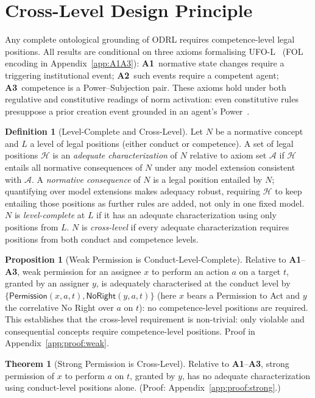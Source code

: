 \documentclass{IOS-Book-Article}
\newcommand{\PermPos}{\mathsf{Permission}}   %
\newcommand{\NoRight}{\mathsf{NoRight}}      %
\theoremstyle{definition}
\newtheorem{definition}{Definition}[section]
\newtheorem{theorem}{Theorem}[section]
\newtheorem{proposition}{Proposition}[section]
\begin{document}
\section{Cross-Level Design Principle}
\label{sec:crosslevel}
Any complete ontological grounding of ODRL requires
competence-level legal positions. All results are conditional on three
axioms formalising UFO-L~\cite{griffo2023powers} (FOL encoding in
Appendix~\ref{app:A1A3}): \textbf{A1}~normative state changes require a
triggering institutional event; \textbf{A2}~such events require a
competent agent; \textbf{A3}~competence is a Power--Subjection pair.
These axioms hold under both regulative and constitutive readings of norm
activation: even constitutive rules presuppose a prior creation event
grounded in an agent's Power~\cite{griffo2023powers}.
\begin{definition}[Level-Complete and Cross-Level]
\label{def:level-complete}
Let $N$ be a normative concept and $L$ a level of legal
positions (either conduct or competence).
A set of legal positions $\mathcal{H}$ is an \emph{adequate
characterization} of $N$ relative to axiom set
$\mathcal{A}$ if $\mathcal{H}$ entails all normative consequences of $N$
under any model extension consistent with $\mathcal{A}$.
A \emph{normative consequence} of $N$ is a legal position entailed by
$N$; quantifying over model extensions makes adequacy robust, requiring
$\mathcal{H}$ to keep entailing those positions as further rules are
added, not only in one fixed model.
$N$ is \emph{level-complete} at $L$ if it has an adequate
characterization using only positions from $L$.
$N$ is \emph{cross-level} if every adequate characterization
requires positions from both conduct and competence levels.
\end{definition}
\begin{proposition}[Weak Permission is Conduct-Level-Complete]
\label{prop:weak-complete}
Relative to \textbf{A1}--\textbf{A3}, weak permission for an assignee
$x$ to perform an action $a$ on a target $t$, granted by an assigner
$y$, is adequately characterised at the conduct level by
$\{\PermPos(x,a,t),\NoRight(y,a,t)\}$ (here $x$ bears a Permission to
Act and $y$ the correlative No Right over $a$ on $t$): no
competence-level positions are required. This establishes that the cross-level requirement is non-trivial: only violable and consequential concepts require competence-level positions. Proof in Appendix~\ref{app:proof:weak}.
\end{proposition}
\begin{theorem}[Strong Permission is Cross-Level]
\label{thm:strong-crosslevel}
Relative to \textbf{A1}--\textbf{A3}, strong permission of $x$ to perform $a$ on $t$, granted by $y$, has no adequate characterization
using conduct-level positions alone. (Proof: Appendix~\ref{app:proof:strong}.)
\end{theorem}
\end{document}
